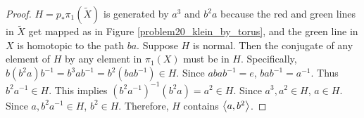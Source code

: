 \documentclass[12pt, psamsfonts]{amsart}
\theoremstyle{definition}
\theoremstyle{remark}
\numberwithin{equation}{section}
\begin{document}
\begin{proof}
  $H = p_*\pi_1(\tilde{X})$ is generated by $a^3$ and $b^2a$ because the red and green lines in $\tilde{X}$ get mapped as in Figure \ref{problem20_klein_by_torus}, and the green line in $X$ is homotopic to the path $ba$.
  Suppose $H$ is normal.
  Then the conjugate of any element of $H$ by any element in $\pi_1(X)$ must be in $H$.
  Specifically, $b(b^2a)b^{-1} = b^3ab^{-1} = b^2(bab^{-1}) \in H$.
  Since $abab^{-1} = e$, $bab^{-1} = a^{-1}$.
  Thus $b^2a^{-1} \in H$.
  This implies $(b^2a^{-1})^{-1}(b^2a) = a^2 \in H$.
  Since $a^3, a^2 \in H$, $a \in H$.
  Since $a, b^2a^{-1} \in H$, $b^2 \in H$.
  Therefore, $H$ contains $\ev{a, b^2}$.
\end{proof}
\end{document}

